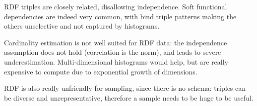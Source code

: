 
RDF triples are closely related, disallowing independence. Soft functional dependencies are indeed very common, with bind triple patterns making the others unselective and not captured by histograms.

Cardinality estimation is not well suited for RDF data: the independence assumption does not hold (correlation is the norm), and leads to severe underestimation. Multi-dimensional histograms would help, but are really expensive to compute due to exponential growth of dimensions.

RDF is also really unfriendly for sampling, since there is no schema: triples can be diverse and unrepresentative, therefore a sample needs to be huge to be useful.
 

 

